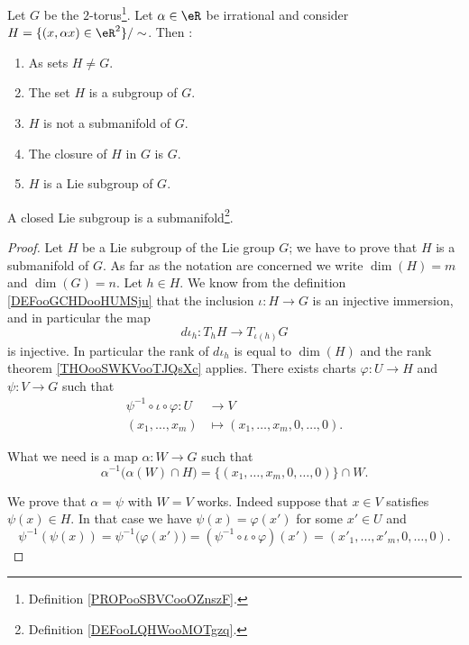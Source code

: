 \begin{proposition}        \label{PROPooJGYRooSKPVSX}
	Let \( G\) be the \( 2\)-torus\footnote{Definition \ref{PROPooSBVCooOZnszF}.}. Let \( \alpha\in \eR\) be irrational and consider \( H=\{ (x,\alpha x)\in \eR^2 \}/\sim\). Then :
	\begin{enumerate}
		\item
		      As sets \( H\neq G\).
		\item
		      The set \( H\) is a subgroup of \( G\).
		\item
		      \( H\) is not a submanifold of \( G\).
		\item
		      The closure of \( H\) in \( G\) is \( G\).
		\item
		      \( H\) is a Lie subgroup of \( G\).
	\end{enumerate}
\end{proposition}


\begin{proposition}     \label{PROPooFXZJooCOFXZX}
	A closed Lie subgroup is a submanifold\footnote{Definition \ref{DEFooLQHWooMOTgzq}.}.
\end{proposition}

\begin{proof}
	Let \( H\) be a Lie subgroup of the Lie group \( G\); we have to prove that \( H\) is a submanifold of \( G\). As far as the notation are concerned we write \( \dim(H)=m\) and \( \dim(G)=n\). Let \( h\in H\). We know from the definition \ref{DEFooGCHDooHUMSju} that the inclusion \( \iota\colon H\to G\) is an injective immersion, and in particular the map
	\begin{equation}
		d\iota_h\colon T_hH\to T_{\iota(h)}G
	\end{equation}
	is injective. In particular the rank of \( d\iota_h\) is equal to \( \dim(H)\) and the rank theorem \ref{THOooSWKVooTJQsXc} applies. There exists charts \( \varphi\colon U\to H\) and \( \psi\colon V\to G\) such that
	\begin{equation}
		\begin{aligned}
			\psi^{-1}\circ\iota\circ\varphi\colon U & \to V                                  \\
			(x_1,\ldots, x_m)                       & \mapsto (x_1,\ldots, x_m,0,\ldots, 0).
		\end{aligned}
	\end{equation}

	What we need is a map \( \alpha\colon W\to G\) such that
	\begin{equation}
		\alpha^{-1}\big( \alpha(W)\cap H \big)=\{ (x_1,\ldots, x_m,0,\ldots, 0) \}\cap W.
	\end{equation}

	We prove that \( \alpha=\psi\) with \( W=V\) works. Indeed suppose that \( x\in V\) satisfies \( \psi(x)\in H\). In that case we have \( \psi(x)=\varphi(x')\) for some \( x'\in U\) and
	\begin{equation}
		\psi^{-1}(\psi(x))=\psi^{-1}\big( \varphi(x') \big)=(\psi^{-1}\circ\iota\circ\varphi)(x')=(x'_1,\ldots, x'_m,0,\ldots, 0).
	\end{equation}
\end{proof}

